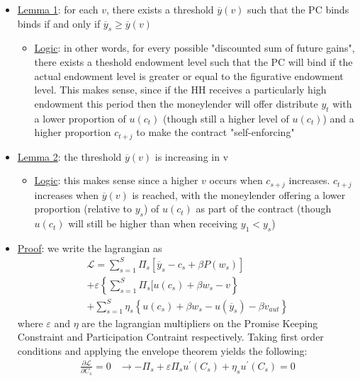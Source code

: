 \documentclass{article}
\begin{document}
\begin{itemize}
\begin{itemize}
        \begin{itemize}
            \item \underline{Lemma 1}: for each $v$, there exists a threshold $\overline{y}(v)$ such that the PC binds binds if and only if $\overline{y}_{s} \geq \overline{y}(v)$
            \begin{itemize}
                \item  \underline{Logic}: in other words, for every possible "discounted sum of future gains", there exists a theshold endowment level such that the PC will bind if the actual endowment level is greater or equal to the figurative endowment level. This makes sense, since if the HH receives a particularly high endowment this period then the moneylender will offer distribute $y_{t}$ with a lower proportion of $u(c_{t})$ (though still a higher level of $u(c_{t})$) and a higher proportion $c_{t+j}$ to make the contract "self-enforcing"
            \end{itemize}
            \item  \underline{Lemma 2}: the threshold $\overline{y}(v)$ is increasing in v
            \begin{itemize}
                \item  \underline{Logic}: this makes sense since a higher $v$ occurs when $c_{s+j}$ increases. $c_{t+j}$ increases when $\overline{y}(v)$ is reached, with the moneylender offering a lower proportion (relative to $y_{s}$) of $u(c_{t})$ as part of the contract (though $u(c_{t})$ will still be higher than when receiving $y_{1} < y_{s}$)
            \end{itemize}
            \item  \underline{Proof}: we write the lagrangian as
            \begin{gather*}
                \mathcal{L} = \sum_{s=1}^{S} \Pi_{s} [\overline{y}_{s} - c_{s} + \beta P(w_{s})] \\ + \varepsilon \left\{ \sum_{s=1}^{S} \Pi_{s} [u(c_{s}) + \beta w_{s} - v \right\} \\ +  \sum_{s=1}^{S} \eta_{s} \left\{ u(c_{s}) + \beta w_{s} - u(\overline{y}_{s}) - \beta v_{aut} \right\}
            \end{gather*}
            where $\varepsilon$ and $\eta$ are the lagrangian multipliers on the Promise Keeping Constraint and Participation Contraint respectively. Taking first order conditions and applying the envelope theorem yields the following:
            \begin{align*}
                \frac{\partial \mathcal{L}}{\partial C_{s}} = 0 &\rightarrow -\Pi_{s} + \varepsilon \Pi_{s} u^{'}(C_{s}) + \eta_{s} u^{'} (C_{s}) = 0 \tag{1} \\

\end{align*}
\end{itemize}
\end{itemize}
\end{itemize}
\end{document}

